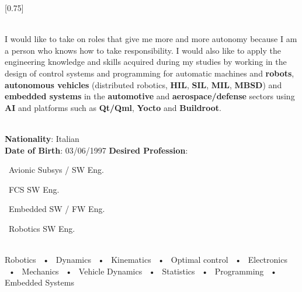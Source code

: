 \documentclass[lighthipster]{simplehipstercv}
\begin{document}
    \setlength{\columnsep}{1.5cm}
    [0.75]
    \begin{paracol}{2}
    
    \paracolbackgroundoptions
    
    
    
    
    \footnotesize
    {
        \setasidefontcolour
        \flushright
        \begin{center}
        \end{center}
        
        \\[0.5em]
            {\footnotesize 
            I would like to take on roles that give me more and more autonomy because I am a person who knows how to take
            responsibility. I would also like to apply the engineering
            knowledge and skills acquired during my studies by working in the
            design of control systems and programming for automatic
            machines and \textbf{robots}, \textbf{autonomous vehicles} (distributed robotics,
            \textbf{HIL}, \textbf{SIL}, \textbf{MIL}, \textbf{MBSD}) and \textbf{embedded systems} in the \textbf{automotive} and
            \textbf{aerospace/defense} sectors using \textbf{AI} and platforms such as \textbf{Qt/Qml},
            \textbf{Yocto} and \textbf{Buildroot}.
            }
        
        \bigskip
        
         \\[0.5em]
        \textbf{Nationality}: Italian \\
        \textbf{Date of Birth}: 03/06/1997
        \textbf{Desired Profession}: \par 
        \textbullet\ Avionic Subsys / SW Eng. \par
        \textbullet\ FCS SW Eng. \par 
        \textbullet\ Embedded SW / FW Eng. \par
        \textbullet\ Robotics SW Eng.
        
        \bigskip
        
         \\[0.5em]
        Robotics ~•~ Dynamics ~•~ Kinematics ~•~ Optimal control ~•~ Electronics ~•~ Mechanics ~•~ Vehicle Dynamics ~•~ Statistics
        ~•~ Programming ~•~ Embedded Systems 
        
}
\end{paracol}
\end{document}
